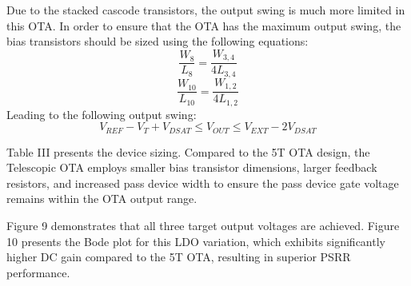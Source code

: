 \documentclass[journal]{IEEEtran}
\begin{document}
Due to the stacked cascode transistors, the output swing is much more limited in this OTA. In order to ensure that the OTA has the maximum output swing, the bias transistors should be sized using the following equations:
\begin{equation}
    \frac{W_{8}}{L_{8}} = \frac{W_{3,4}}{4L_{3,4}}
\end{equation}
\begin{equation}
    \frac{W_{10}}{L_{10}} = \frac{W_{1,2}}{4L_{1,2}}
\end{equation}
Leading to the following output swing:
\begin{equation}
    V_{REF} - V_{T} + V_{DSAT} \leq V_{OUT} \leq V_{EXT} - 2V_{DSAT}
\end{equation}

Table III presents the device sizing. Compared to the 5T OTA design, the Telescopic OTA employs smaller bias transistor dimensions, larger feedback resistors, and increased pass device width to ensure the pass device gate voltage remains within the OTA output range.

Figure 9 demonstrates that all three target output voltages are achieved. Figure 10 presents the Bode plot for this LDO variation, which exhibits significantly higher DC gain compared to the 5T OTA, resulting in superior PSRR performance.
\end{document}
